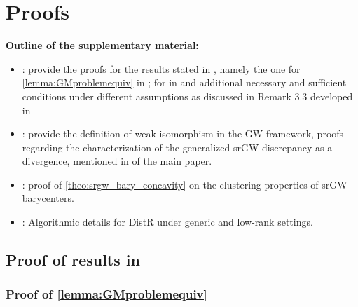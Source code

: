 \section{Proofs}

\textbf{Outline of the supplementary material:}
\begin{itemize}
	\item {}: provide the proofs for the results stated in , namely the one for \cref{lemma:GMproblemequiv} in ; for  in   and additional necessary and sufficient conditions under different assumptions as discussed in Remark 3.3 developed in 
	\item {}: provide the definition of weak isomorphism in the GW framework, proofs regarding the characterization of the generalized srGW discrepancy as a divergence, mentioned in  of the main paper.
	\item {}: proof of \cref{theo:srgw_bary_concavity} on the clustering properties of srGW barycenters.
	\item {}: Algorithmic details for DistR under generic and low-rank settings.
\end{itemize}

\subsection{Proof of results in }\label{sec:DR_as_OT_supp}

\subsubsection{Proof of \cref{lemma:GMproblemequiv} \label{proof:GMproblemequiv}}

